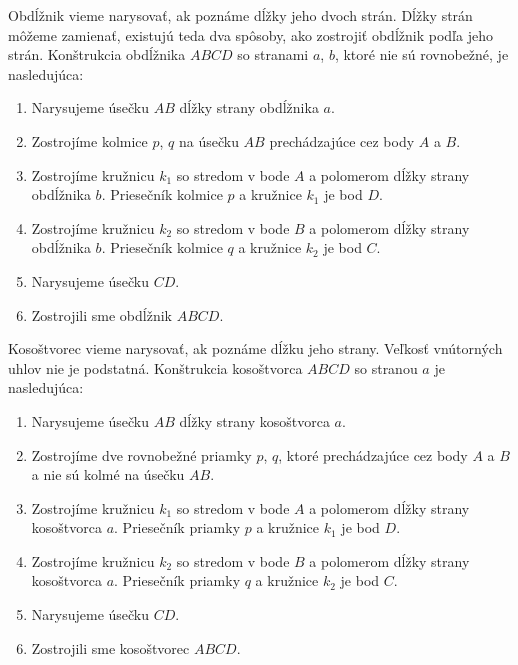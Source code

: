 \documentclass{report}
\begin{document}
Obdĺžnik vieme narysovať, ak poznáme dĺžky jeho dvoch strán. Dĺžky strán môžeme zamienať, existujú teda dva spôsoby, ako zostrojiť obdĺžnik podľa jeho strán. Konštrukcia obdĺžnika \(ABCD\) so stranami \(a\), \(b\), ktoré nie sú rovnobežné, je nasledujúca:
\begin{enumerate}[label=\arabic*)]
  \item Narysujeme úsečku \(AB\) dĺžky strany obdĺžnika \(a\).
  \item Zostrojíme kolmice \(p\), \(q\) na úsečku \(AB\) prechádzajúce cez body \(A\) a \(B\).
  \item Zostrojíme kružnicu \(k_1\) so stredom v bode \(A\) a polomerom dĺžky strany obdĺžnika \(b\). Priesečník kolmice \(p\) a kružnice \(k_1\) je bod \(D\).
  \item Zostrojíme kružnicu \(k_2\) so stredom v bode \(B\) a polomerom dĺžky strany obdĺžnika \(b\). Priesečník kolmice \(q\) a kružnice \(k_2\) je bod \(C\).
  \item Narysujeme úsečku \(CD\).
  \item Zostrojili sme obdĺžnik \(ABCD\).
\end{enumerate}

Kosoštvorec vieme narysovať, ak poznáme dĺžku jeho strany. Veľkosť vnútorných uhlov nie je podstatná. Konštrukcia kosoštvorca \(ABCD\) so stranou \(a\) je nasledujúca:
\begin{enumerate}[label=\arabic*)]
  \item Narysujeme úsečku \(AB\) dĺžky strany kosoštvorca \(a\).
  \item Zostrojíme dve rovnobežné priamky \(p\), \(q\), ktoré prechádzajúce cez body \(A\) a \(B\) a nie sú kolmé na úsečku \(AB\).
  \item Zostrojíme kružnicu \(k_1\) so stredom v bode \(A\) a polomerom dĺžky strany kosoštvorca \(a\). Priesečník priamky \(p\) a kružnice \(k_1\) je bod \(D\).
  \item Zostrojíme kružnicu \(k_2\) so stredom v bode \(B\) a polomerom dĺžky strany kosoštvorca \(a\). Priesečník priamky \(q\) a kružnice \(k_2\) je bod \(C\).
  \item Narysujeme úsečku \(CD\).
  \item Zostrojili sme kosoštvorec \(ABCD\).
\end{enumerate}
\end{document}
